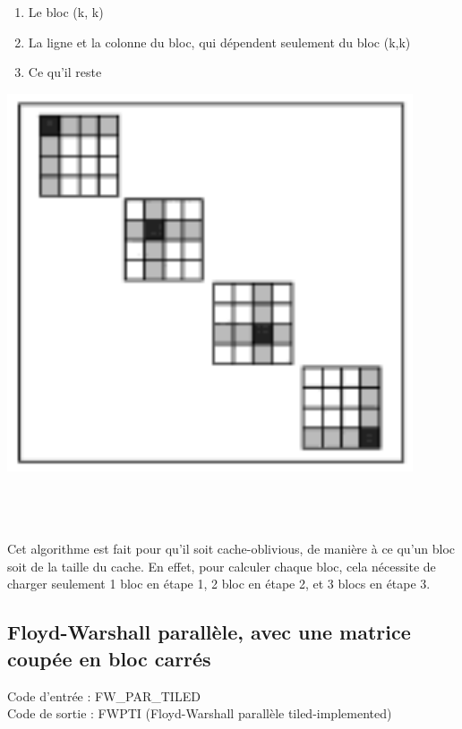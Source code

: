 \documentclass[a4paper,11pt]{article}
\begin{document}
\begin{minipage}{0.50\linewidth}
  \begin{enumerate}
    \item Le bloc (k, k)
    \item La ligne et la colonne du bloc, qui dépendent seulement du bloc (k,k)
    \item Ce qu'il reste
  \end{enumerate}
\end{minipage}\hfill
\begin{minipage}{0.4\linewidth}
  \begin{center}
    \includegraphics[scale=0.5]{FW_SEQ_TILED2.png}
  \end{center}
\end{minipage}
~\\\\\\
\indent Cet algorithme est fait pour qu'il soit cache-oblivious, de manière à ce qu'un bloc soit de la taille du cache. En effet, pour calculer chaque bloc, cela nécessite de charger seulement 1 bloc en étape 1, 2 bloc en étape 2, et 3 blocs en étape 3.

\subsection{Floyd-Warshall parallèle, avec une matrice coupée en bloc carrés}

\noindent Code d'entrée : FW\_PAR\_TILED \\
Code de sortie : FWPTI (Floyd-Warshall parallèle tiled-implemented)\\
\end{document}
